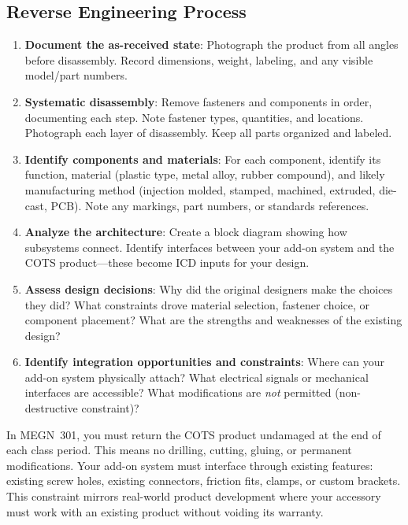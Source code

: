 \documentclass[11pt,letterpaper,twoside,openany]{book}
\begin{document}
\subsection{Reverse Engineering Process}
\begin{enumerate}[leftmargin=1.5em]
\item \textbf{Document the as-received state}: Photograph the product from all angles before disassembly. Record dimensions, weight, labeling, and any visible model/part numbers.
\item \textbf{Systematic disassembly}: Remove fasteners and components in order, documenting each step. Note fastener types, quantities, and locations. Photograph each layer of disassembly. Keep all parts organized and labeled.
\item \textbf{Identify components and materials}: For each component, identify its function, material (plastic type, metal alloy, rubber compound), and likely manufacturing method (injection molded, stamped, machined, extruded, die-cast, PCB). Note any markings, part numbers, or standards references.
\item \textbf{Analyze the architecture}: Create a block diagram showing how subsystems connect. Identify interfaces between your add-on system and the COTS product---these become ICD inputs for your design.
\item \textbf{Assess design decisions}: Why did the original designers make the choices they did? What constraints drove material selection, fastener choice, or component placement? What are the strengths and weaknesses of the existing design?
\item \textbf{Identify integration opportunities and constraints}: Where can your add-on system physically attach? What electrical signals or mechanical interfaces are accessible? What modifications are \emph{not} permitted (non-destructive constraint)?
\end{enumerate}

\begin{warningbox}
In MEGN~301, you must return the COTS product undamaged at the end of each class period. This means no drilling, cutting, gluing, or permanent modifications. Your add-on system must interface through existing features: existing screw holes, existing connectors, friction fits, clamps, or custom brackets. This constraint mirrors real-world product development where your accessory must work with an existing product without voiding its warranty.
\end{warningbox}
\end{document}
